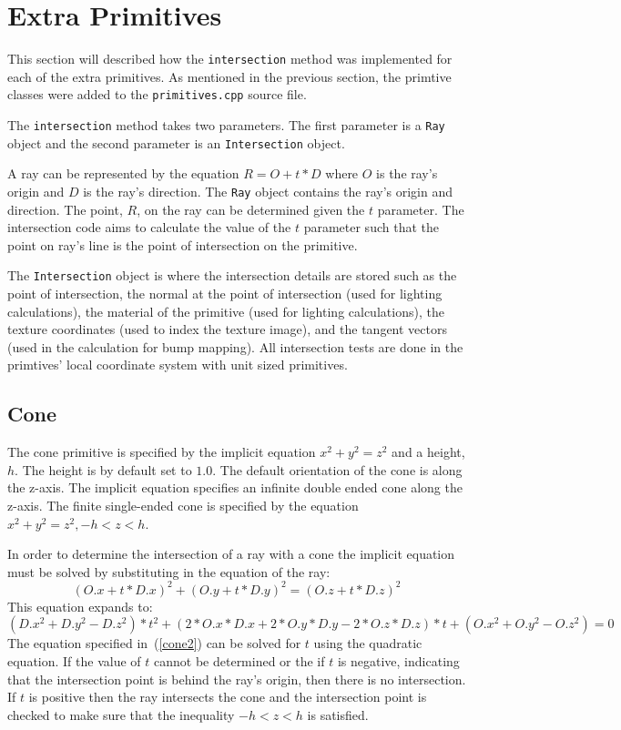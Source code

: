 \section{Extra Primitives}

This section will described how the \verb|intersection| method was
implemented for each of the extra primitives. As mentioned in the previous
section, the primtive classes were added to the \verb|primitives.cpp| source 
file.

The \verb|intersection| method takes two parameters. The first parameter is a
\verb|Ray| object and the second parameter is an \verb|Intersection| object. 

A ray can be represented by the equation $R = O + t*D$ where $O$ is the ray's 
origin and $D$ is the ray's direction. The \verb|Ray| object contains the ray's 
origin and direction. The point, $R$, on the ray can be determined given the $t$ 
parameter. The intersection code aims to calculate the value of the $t$ 
parameter such that the point on ray's line is the point of intersection on the 
primitive. 

The \verb|Intersection| object is where the intersection details are
stored such as the point of intersection, the normal at the point of
intersection (used for lighting calculations), the material of the primitive
(used for lighting calculations), the texture coordinates (used to index the
texture image), and the tangent vectors (used in the calculation for bump
mapping). All intersection tests are done in the primtives' local coordinate
system with unit sized primitives.

\subsection*{Cone}
The cone primitive is specified by the implicit equation $x^2 + y^2 = z^2$ and a
height, $h$. The height is by default set to $1.0$. The default orientation of 
the cone is along the z-axis. The implicit equation specifies an infinite double 
ended cone along the z-axis. The finite single-ended cone is specified by the
equation $x^2 + y^2 = z^2, -h < z < h$. 

In order to determine the intersection of a ray with a cone the implicit
equation must be solved by substituting in the equation of the ray:
\begin{equation}
  (O.x + t*D.x)^2 + (O.y + t*D.y)^2 = (O.z + t*D.z)^2\label{cone1}
\end{equation}
This equation expands to:
\begin{equation}
  (D.x^2 + D.y^2 - D.z^2)*t^2 + (2*O.x*D.x + 2*O.y*D.y - 2*O.z*D.z)*t + (O.x^2 +
  O.y^2 - O.z^2) = 0\label{cone2}
\end{equation}
The equation specified in~(\ref{cone2}) can be solved for $t$ using the
quadratic equation. If the value of $t$ cannot be determined or the if $t$ is
negative, indicating that the intersection point is behind the ray's origin,
then there is no intersection. If $t$ is positive then the ray intersects the
cone and the intersection point is checked to make sure that the inequality $-h
< z < h$ is satisfied.


